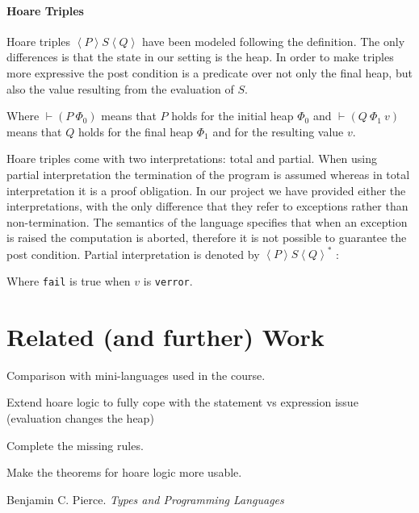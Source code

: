 \documentclass[12pt, a4paper, oneside]{article}
\newcommand{\sproof}{
  \scriptsize
  \begin{center}
  \begin{prooftree}
  \def\defaultHypSeparation{\hskip .1in}
}
\newcommand{\eproof}{
  \end{prooftree}
  \end{center}
  \normalsize
}
\begin{document}
\paragraph{Hoare Triples}
Hoare triples $ \left\langle P \right\rangle   S \left\langle Q \right\rangle$ have been modeled following the definition. The only differences is that the state in our  setting is the heap. In order to make triples more expressive the post condition is a predicate over not only the final heap, but also the value resulting from the evaluation of $S$.

\sproof
{}
\eproof
Where $\vdash (P\  \Phi_0)$ means that $P$ holds for the initial heap $\Phi_0$ and $\vdash (Q\ \Phi_1\ v)$ means that $Q$ holds for the final heap $\Phi_1$ and for the resulting value $v$.

Hoare triples come with two interpretations: total and partial.
When using partial interpretation the termination of the program is assumed whereas in total interpretation it is a proof obligation.
In our project we have provided either the interpretations, with the only difference that they refer to exceptions rather than non-termination.
The semantics of the language specifies that when an exception is raised the computation is aborted, therefore it is not possible to guarantee the post condition.
Partial interpretation is denoted by $ \left\langle P \right\rangle  S \left\langle Q \right\rangle^*$ :
\sproof
{}
\eproof
Where \texttt{fail} is true when $v$ is \texttt{verror}.



\section{Related (and further) Work}

Comparison with mini-languages used in the course.

Extend hoare logic to fully cope with the statement vs expression issue (evaluation changes the heap) 

Complete the missing rules. 

Make the theorems for hoare logic more usable.



\begin{thebibliography}{1}

  Benjamin C. Pierce.
  \emph{Types and Programming Languages}

\end{thebibliography}
\end{document}
